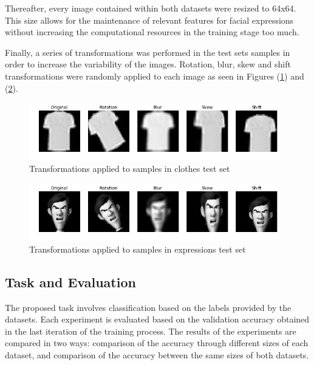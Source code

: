 \documentclass{article}
\begin{document}
Thereafter, every image contained within both datasets were resized to 64x64. This size allows for the maintenance of relevant features for facial expressions without increasing the computational resources in the training stage too much.

Finally, a series of transformations was performed in the test sets samples in order to increase the variability of the images. Rotation, blur, skew and shift transformations were randomly applied to each image as seen in Figures (\ref{fig:3}) and (\ref{fig:4}).

\begin{figure}[!htb]
	\vskip 5mm
		\begin{center}
			\includegraphics[height=2.5cm]{augmented_clothes}
			\caption{Transformations applied to samples in clothes test set}
			\label{fig:3}
		\end{center}
	\vskip -5mm
\end{figure}

\begin{figure}[!htb]
	\vskip 5mm
		\begin{center}
			\includegraphics[height=2.5cm]{augmented_expressions}
			\caption{Transformations applied to samples in expressions test set}
			\label{fig:4}
		\end{center}
	\vskip -5mm
\end{figure}

\subsection{Task and Evaluation}
\label{sec:evaluation}
The proposed task involves classification based on the labels provided by the datasets. Each experiment is evaluated based on the validation accuracy obtained in the last iteration of the training process. The results of the experiments are compared in two ways: comparison of the accuracy through different sizes of each dataset, and comparison of the accuracy between the same sizes of both datasets.
\end{document}
